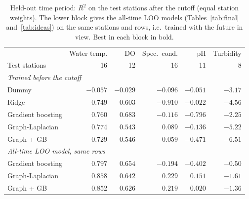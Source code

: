 \documentclass[11pt]{article}
\begin{document}
\begin{table}[h]
\centering
\small
\caption{Held-out time period: $R^2$ on the test stations after the cutoff (equal station
weights). The lower block gives the all-time LOO models (Tables~\ref{tab:final} and~\ref{tab:ideas})
on the same stations and rows, i.e.\ trained with the future in view. Best in each block in bold.}
\label{tab:timesplit}
\begin{tabular}{l rrrrr}
\toprule
 & Water temp. & DO & Spec.\ cond. & pH & Turbidity \\
Test stations & 16 & 12 & 16 & 11 & 8 \\
\midrule
\multicolumn{6}{l}{\emph{Trained before the cutoff}} \\
Dummy                & $-0.057$ & $-0.029$ & $-0.096$ & $-0.051$ & $-3.17$ \\
Ridge                & $0.749$  & $0.603$  & $-0.910$ & $\mathbf{-0.022}$ & $-4.56$ \\
Gradient boosting    & $0.760$  & $\mathbf{0.683}$  & $-0.116$ & $-0.796$ & $\mathbf{-2.25}$ \\
Graph-Laplacian      & $\mathbf{0.774}$  & $0.543$  & $\mathbf{0.089}$  & $-0.136$ & $-5.22$ \\
Graph + GB           & $0.729$  & $0.546$  & $0.059$  & $-0.471$ & $-6.51$ \\
\midrule
\multicolumn{6}{l}{\emph{All-time LOO model, same rows}} \\
Gradient boosting    & $0.797$ & $\mathbf{0.654}$ & $-0.194$ & $-0.402$ & $\mathbf{-0.50}$ \\
Graph-Laplacian      & $\mathbf{0.858}$ & $0.642$ & $\mathbf{0.229}$  & $\mathbf{0.151}$  & $-1.61$ \\
Graph + GB           & $0.852$ & $0.626$ & $0.219$  & $0.020$  & $-1.36$ \\
\bottomrule
\end{tabular}
\end{table}
\end{document}
